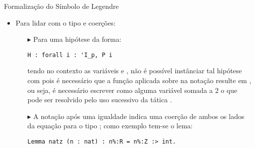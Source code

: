 \begin{frame}[fragile]{Formalização do Símbolo de Legendre}
    \begin{itemize}
        \item Para lidar com o tipo  e coerções:
            \begin{itemize}
                \item[$\blacktriangleright$] Para uma hipótese da forma:
                    \begin{lstlisting}[language=coq,frame=single,tabsize=1]
H : forall i : 'I_p, P i
                    \end{lstlisting}
                tendo no contexto as variáveis  e , não é possível instânciar tal hipótese com  pois é necessário que a 
                função aplicada sobre  na notação resulte em , ou seja, é necessário escrever  como alguma variável somada a $2$ o que pode ser resolvido pelo uso sucessivo da tática . 
                \item[]
                \item[{$\blacktriangleright$}] A notação  após uma igualdade indica uma coerção de ambos os lados da equação para o tipo ; como exemplo tem-se o lema:
                    \begin{lstlisting}[language=coq,frame=single,tabsize=1]
Lemma natz (n : nat) : n%:R = n%:Z :> int.
                    \end{lstlisting}
                

            \end{itemize}
            
    \end{itemize}
\end{frame}